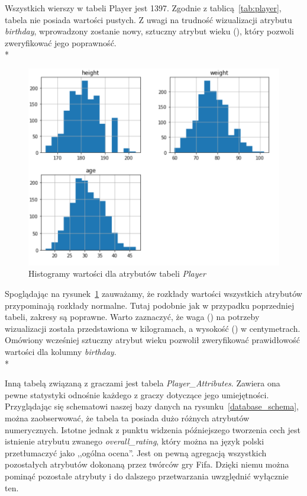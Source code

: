     \noindent Wszystkich wierszy w tabeli Player jest 1397. Zgodnie z tablicą~\ref{tab:player}, tabela nie posiada wartości pustych. Z uwagi na trudność wizualizacji atrybutu \emph{birthday}, wprowadzony zostanie nowy, sztuczny atrybut wieku (), który pozwoli zweryfikować jego poprawność. \\*
    
    \begin{figure}[H] 
        \centering\includegraphics[width=\textwidth]{figures/player.png}
        \caption{Histogramy wartości dla atrybutów tabeli \emph{Player}}
        \label{fig:player}
    \end{figure}
    
    \noindent Spoglądając na rysunek~\ref{fig:player} zauważamy, że rozkłady wartości wszystkich atrybutów przypominają rozkłady normalne. Tutaj podobnie jak w przypadku poprzedniej tabeli, zakresy są poprawne. Warto zaznaczyć, że waga () na potrzeby wizualizacji została przedstawiona w kilogramach, a wysokość () w centymetrach. Omówiony wcześniej sztuczny atrybut wieku pozwolił zweryfikować prawidłowość wartości dla kolumny \textit{birthday}. \\*
    
    \noindent Inną tabelą związaną z graczami jest tabela \emph{Player\_Attributes}. Zawiera ona pewne statystyki odnośnie każdego z graczy dotyczące jego umiejętności. Przyglądając się schematowi naszej bazy danych na rysunku~\ref{database_schema}, można zaobserwować, że tabela ta posiada dużo różnych atrybutów numerycznych. Istotne jednak z punktu widzenia późniejszego tworzenia cech jest istnienie atrybutu zwanego \emph{overall\_rating}, który można na język polski przetłumaczyć jako ,,ogólna ocena''. Jest on pewną agregacją wszystkich pozostałych atrybutów dokonaną przez twórców gry Fifa. Dzięki niemu można pominąć pozostałe atrybuty i do dalszego przetwarzania uwzględnić wyłącznie ten.
    
